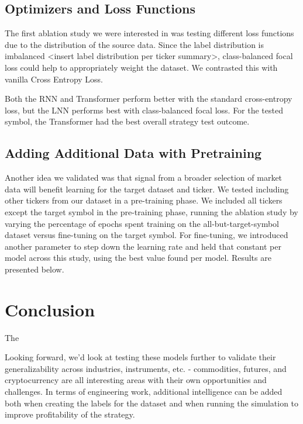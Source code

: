 \documentclass[10pt,twocolumn,letterpaper]{article}
\begin{document}
\subsection{Optimizers and Loss Functions}

The first ablation study we were interested in was testing different loss functions due to the distribution of the source data. Since the label distribution is imbalanced <insert label distribution per ticker summary>, class-balanced focal loss could help to appropriately weight the dataset. We contrasted this with vanilla Cross Entropy Loss.


Both the RNN and Transformer perform better with the standard cross-entropy loss, but the LNN performs best with class-balanced focal loss. For the tested symbol, the Transformer had the best overall strategy test outcome.

\subsection{Adding Additional Data with Pretraining}

Another idea we validated was that signal from a broader selection of market data will benefit learning for the target dataset and ticker. We tested including other tickers from our dataset in a pre-training phase. We included all tickers except the target symbol in the pre-training phase, running the ablation study by varying the percentage of epochs spent training on the all-but-target-symbol dataset versus fine-tuning on the target symbol. For fine-tuning, we introduced another parameter to step down the learning rate and held that constant per model across this study, using the best value found per model.  Results are presented below.


\section{Conclusion}

The

Looking forward, we’d look at testing these models further to validate their generalizability across industries, instruments, etc. - commodities, futures, and cryptocurrency are all interesting areas with their own opportunities and challenges. In terms of engineering work, additional intelligence can be added both when creating the labels for the dataset and when running the simulation to improve profitability of the strategy.
\end{document}
